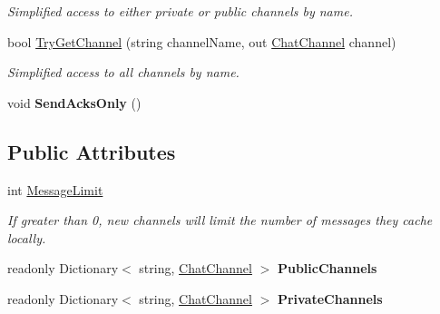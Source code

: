\begin{DoxyCompactItemize}
\begin{DoxyCompactList}\small\item\em Simplified access to either private or public channels by name. \end{DoxyCompactList}\item 
bool \hyperlink{class_exit_games_1_1_client_1_1_photon_1_1_chat_1_1_chat_client_ad48f9b88b0635c9f2363322123044fb8}{Try\+Get\+Channel} (string channel\+Name, out \hyperlink{class_exit_games_1_1_client_1_1_photon_1_1_chat_1_1_chat_channel}{Chat\+Channel} channel)
\begin{DoxyCompactList}\small\item\em Simplified access to all channels by name. \end{DoxyCompactList}\item 
void {\bfseries Send\+Acks\+Only} ()\hypertarget{class_exit_games_1_1_client_1_1_photon_1_1_chat_1_1_chat_client_a6b1cdbd8b56655e88e678441452f65a1}{}\label{class_exit_games_1_1_client_1_1_photon_1_1_chat_1_1_chat_client_a6b1cdbd8b56655e88e678441452f65a1}

\end{DoxyCompactItemize}
\subsection*{Public Attributes}
\begin{DoxyCompactItemize}
\item 
int \hyperlink{class_exit_games_1_1_client_1_1_photon_1_1_chat_1_1_chat_client_a66e028cd73b441bbdd8d37ee0e2b1dee}{Message\+Limit}
\begin{DoxyCompactList}\small\item\em If greater than 0, new channels will limit the number of messages they cache locally. \end{DoxyCompactList}\item 
readonly Dictionary$<$ string, \hyperlink{class_exit_games_1_1_client_1_1_photon_1_1_chat_1_1_chat_channel}{Chat\+Channel} $>$ {\bfseries Public\+Channels}\hypertarget{class_exit_games_1_1_client_1_1_photon_1_1_chat_1_1_chat_client_aa3d4261b652969dd5f94971ca48f5a7e}{}\label{class_exit_games_1_1_client_1_1_photon_1_1_chat_1_1_chat_client_aa3d4261b652969dd5f94971ca48f5a7e}

\item 
readonly Dictionary$<$ string, \hyperlink{class_exit_games_1_1_client_1_1_photon_1_1_chat_1_1_chat_channel}{Chat\+Channel} $>$ {\bfseries Private\+Channels}\hypertarget{class_exit_games_1_1_client_1_1_photon_1_1_chat_1_1_chat_client_a25f9db0c022bb0feda81d31f43053a81}{}\label{class_exit_games_1_1_client_1_1_photon_1_1_chat_1_1_chat_client_a25f9db0c022bb0feda81d31f43053a81}

\end{DoxyCompactItemize}
